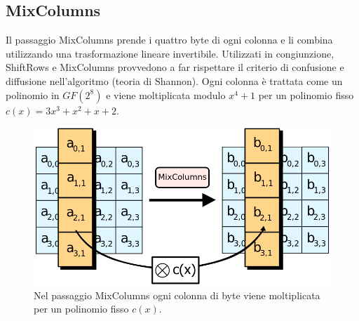 \subsection{MixColumns}
Il passaggio MixColumns prende i quattro byte di ogni colonna e li combina utilizzando una trasformazione lineare invertibile. Utilizzati in congiunzione, ShiftRows e MixColumns provvedono a far rispettare il criterio di confusione e diffusione nell'algoritmo (teoria di Shannon). Ogni colonna è trattata come un polinomio in \(GF(2^8)\) e viene moltiplicata modulo \(x^4+1\) per un polinomio fisso \(c(x)=3x^3+x^2+x+2\).

\begin{figure}[H]
\centering
\includegraphics[scale=0.3]{img/mixColumns}
\caption{Nel passaggio MixColumns ogni colonna di byte viene moltiplicata per un polinomio fisso \(c(x)\).}
\end{figure}
